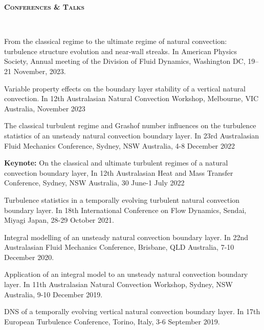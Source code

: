 \documentclass[letterpaper, 10pt]{article}
\newenvironment{changemargin}[2]{%
  \begin{list}{}{%
      \setlength{\topsep}{0pt}%
      \setlength{\leftmargin}{#1}%
      \setlength{\rightmargin}{#2}%
      \setlength{\listparindent}{\parindent}%
      \setlength{\itemindent}{\parindent}%
      \setlength{\parsep}{\parskip}%
    }%
  \item[]}{\end{list}
}
\newcommand{\lineover}{
  \begin{changemargin}{-0.05in}{-0.05in}
    \vspace*{-8pt}
    \hrulefill \\
    \vspace*{-2pt}
  \end{changemargin}
}
\newcommand{\header}[1]{
  \begin{changemargin}{-0.5in}{-0.5in}
    \textbf{\scshape{#1}}\\
    \lineover
  \end{changemargin}
}
\newenvironment{body} {
  \vspace*{-16pt}
  \begin{changemargin}{-0.25in}{-0.5in}
  }
  {\end{changemargin}
}
\begin{document}
\header{Conferences \& Talks}
\begin{body}
  \vspace{14pt}
  
  From the classical regime to the ultimate regime of natural convection: turbulence structure evolution and near-wall streaks. In American Physics Society, Annual meeting of the Division of Fluid Dynamics, Washington DC, 19--21 November, 2023.
  
  \smallskip
  
  Variable property effects on the boundary layer stability of a vertical natural convection. In 12th Australasian Natural Convection Workshop, Melbourne, VIC Australia, November 2023
    
  \smallskip
  
  The classical turbulent regime and Grashof number influences on the turbulence statistics of an unsteady natural convection boundary layer. In 23rd Australasian Fluid Mechanics Conference, Sydney, NSW Australia, 4-8 December 2022
  
  \smallskip
  
  {\bf Keynote: } On the classical and ultimate turbulent regimes of a natural convection boundary layer, In 12th Australasian Heat and Mass Transfer Conference, Sydney, NSW Australia, 30 June-1 July 2022
  
  \smallskip

    Turbulence statistics in a temporally evolving turbulent natural convection boundary layer. In 18th International Conference on Flow Dynamics, Sendai, Miyagi Japan, 28-29 October 2021.

  \smallskip

  Integral modelling of an unsteady natural convection boundary layer. In 22nd Australasian Fluid Mechanics Conference, Brisbane, QLD Australia, 7-10 December 2020.
  
  \smallskip
  
  Application of an integral model to an unsteady natural convection boundary layer. In 11th Australasian Natural Convection Workshop, Sydney, NSW Australia, 9-10 December 2019.
  
  \smallskip
  
  DNS of a temporally evolving vertical natural convection boundary layer. In 17th European Turbulence Conference, Torino, Italy, 3-6 September 2019.
  
  \smallskip
  

\end{body}
\end{document}
